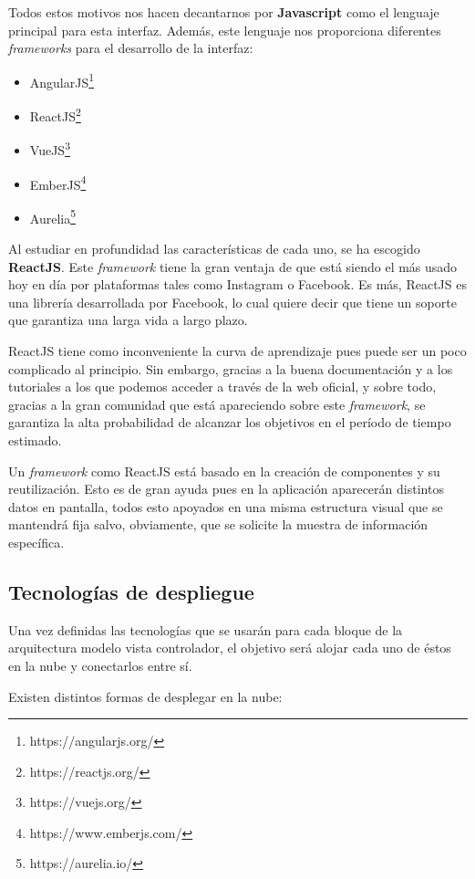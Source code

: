 Todos estos motivos nos hacen decantarnos por \textbf{Javascript} como el lenguaje principal para esta interfaz. Además, este lenguaje nos proporciona diferentes \textit{frameworks} para el desarrollo de la interfaz\cite{framework}:

\begin{itemize}
    \item AngularJS\footnote{https://angularjs.org/}
    \item ReactJS\footnote{https://reactjs.org/}
    \item VueJS\footnote{https://vuejs.org/}
    \item EmberJS\footnote{https://www.emberjs.com/}
    \item Aurelia\footnote{https://aurelia.io/}
\end{itemize}

Al estudiar en profundidad las características de cada uno\cite{framework2}, se ha escogido \textbf{ReactJS}. Este \textit{framework} tiene la gran ventaja de que está siendo el más usado hoy en día por plataformas tales como Instagram o Facebook. Es más, ReactJS es una librería desarrollada por Facebook, lo cual quiere decir que tiene un soporte que garantiza una larga vida a largo plazo.

ReactJS tiene como inconveniente la curva de aprendizaje pues puede ser un poco complicado al principio. Sin embargo, gracias a la buena documentación y a los tutoriales a los que podemos acceder a través de la web oficial, y sobre todo, gracias a la gran comunidad que está apareciendo sobre este \textit{framework}, se garantiza la alta probabilidad de alcanzar los objetivos en el período de tiempo estimado.

Un \textit{framework} como ReactJS está basado en la creación de componentes y su reutilización. Esto es de gran ayuda pues en la aplicación aparecerán distintos datos en pantalla, todos esto apoyados en una misma estructura visual que se mantendrá fija salvo, obviamente, que se solicite la muestra de información específica.

\subsection{Tecnologías de despliegue}

Una vez definidas las tecnologías que se usarán para cada bloque de la arquitectura modelo vista controlador, el objetivo será alojar cada uno de éstos en la nube y conectarlos entre sí. 

Existen distintos formas de desplegar en la nube\cite{cloud}\cite{cloud2}\cite{cloud3}\cite{cloud4}:

